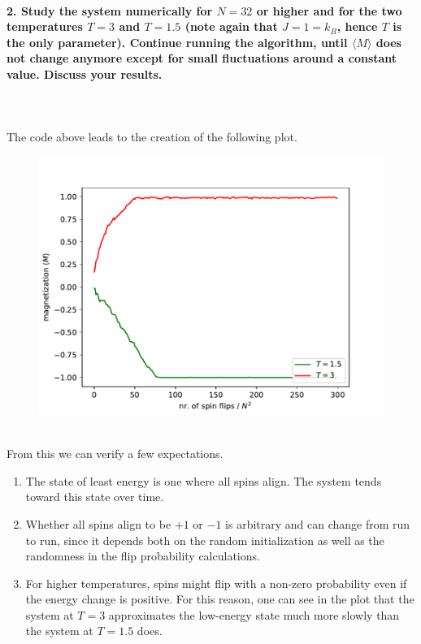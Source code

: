 \newpage
\paragraph{2. Study the system numerically for $N=32$ or 
    higher and for the two temperatures $T=3$ and $T=1.5$ 
    (note again that $J=1=k_B$, hence $T$ is the only 
    parameter). Continue running the algorithm, until 
    $\langle M\rangle$ does not change anymore except for 
    small fluctuations around a constant value. Discuss 
    your results.
} \ \\
    \\
    The code above leads to the creation of the following
    plot.
    \begin{figure}[h!]
        \centering
        \includegraphics[width=.7\textwidth]{./figures/magnetization_vs_time.pdf}
    \end{figure} \ \\ 
    From this we can verify a few expectations.
    \begin{enumerate}
        \item The state of least energy is one where all 
            spins align. The system tends toward
            this state over time. 
        \item Whether all spins align to be $+1$ or $-1$ 
            is arbitrary and can change from run to run,
            since it depends both on the random 
            initialization as well as the randomness 
            in the flip probability calculations.
        \item For higher temperatures, spins might flip 
            with a non-zero probability even if the 
            energy change is positive. For this reason, 
            one can see in the plot that the system at 
            $T=3$ approximates the low-energy state much 
            more slowly than the system at $T=1.5$ does.
    \end{enumerate}

\newpage
 \ \\
